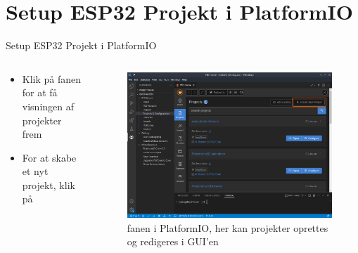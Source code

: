 \documentclass[aspectratio=169]{beamer}
\begin{document}
\section{Setup ESP32 Projekt i PlatformIO}
\begin{frame}
\end{frame}

\begin{frame}{Setup ESP32 Projekt i PlatformIO}
\begin{columns}
	\begin{column}{0.5\textwidth}
		\begin{textBox}
			\begin{itemize}
				\item Klik på fanen  for at få visningen af projekter frem
				\item For at skabe et nyt projekt, klik på 
			\end{itemize}
		\end{textBox}
	\end{column}
	\begin{column}{0.5\textwidth}
		\begin{figure}
  			\includegraphics[width=\textwidth,keepaspectratio=true]{assets/pictures/pio-project.png}
  			\caption{ fanen i PlatformIO, her kan projekter oprettes og redigeres i GUI'en}
  			\label{fig:pio-project}
		\end{figure}
	\end{column}
\end{columns}
\end{frame}
\end{document}
